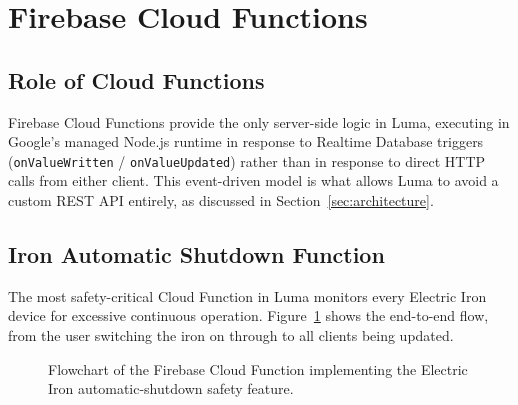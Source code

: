 \documentclass[11pt,a4paper]{article}
\begin{document}
\section{Firebase Cloud Functions}
\label{sec:cloudfunctions}

\subsection{Role of Cloud Functions}
Firebase Cloud Functions provide the only server-side logic in Luma, executing in Google's managed Node.js runtime in response to Realtime Database triggers (\texttt{onValueWritten} / \texttt{onValueUpdated}) rather than in response to direct HTTP calls from either client. This event-driven model is what allows Luma to avoid a custom REST API entirely, as discussed in Section~\ref{sec:architecture}.

\subsection{Iron Automatic Shutdown Function}
The most safety-critical Cloud Function in Luma monitors every Electric Iron device for excessive continuous operation. Figure~\ref{fig:cloud-function-flow} shows the end-to-end flow, from the user switching the iron on through to all clients being updated.

\begin{figure}[H]
\centering
{}
\caption{Flowchart of the Firebase Cloud Function implementing the Electric Iron automatic-shutdown safety feature.}
\label{fig:cloud-function-flow}
\end{figure}
\end{document}
